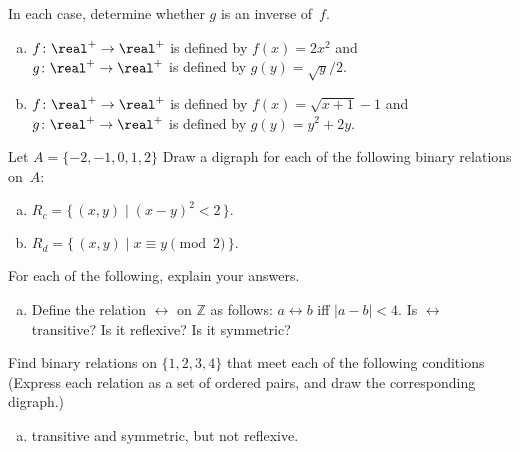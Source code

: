  \begin{exercise}\label{exercise:TestPractice:VerifyInverseExers}
 In each case, determine whether $g$ is an inverse of~$f$.
 \begin{enumerate}[(a)]
 \item \label{VerifyInverseExers-(x^2)}
$f \colon \real^+ \to \real^+$ is defined by $f(x) =2x^2$ and 
 \\ $g \colon \real^+ \to \real^+$ is defined by $g(y) = \sqrt{y}/2$.
 \item \label{VerifyInverseExers-(sqrt(x+1)-1)}
$f \colon \real^+ \to \real^+$ is defined by $f(x) = \sqrt{x+1} - 1$ and 
 \\ $g \colon \real^+ \to \real^+$ is defined by $g(y) = y^2 + 2y$.
 \end{enumerate}
 \end{exercise}

\begin{exer} \label{DrawBinRelExer}
Let $A =  \{-2,-1,0,1,2\}$ Draw a digraph for each of the following binary relations on~$A$: 
 \begin{enumerate}[(a)]
 \item \label{DrawBinRelExer-married}
 $ R_c = \{\, (x,y) \mid  (x-y)^2 < 2 \,\} .$
  \item \label{DrawBinRelExer-lived}
$ R_d = \{\, (x,y) \mid  x\equiv y \pmod{2} \,\} .$
 \end{enumerate}
 \end{exer}

\begin{exercise}\label{exercise:TestPractice:17}
For each of the following, explain your answers. 
\begin{enumerate}[(a)]
\item Define the relation $\rel$ on $\mathbb{Z}$ as follows: $ a \rel b$ iff $|a - b|< 4$. Is $\rel$ transitive? Is it reflexive? Is it symmetric?
\end{enumerate}
\end{exercise}

\begin{exer} \label{BinRelSomePropsEx}
Find binary relations on $\{1,2,3,4\}$ that meet each of the following conditions 
(Express each relation as a set of ordered pairs, and draw the corresponding digraph.)
\begin{enumerate}[(a)]
\item \label{BinRelSomePropsEx-transandsymm}
transitive and symmetric, but not reflexive.
\end{enumerate}
\end{exer}

